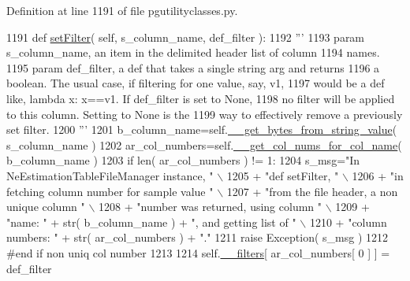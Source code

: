 Definition at line 1191 of file pgutilityclasses.\+py.


\begin{DoxyCode}
1191     \textcolor{keyword}{def }\hyperlink{classnegui_1_1pgutilityclasses_1_1NeEstimationTableFileManager_ad99b7e0a807b3bc0b52ffe7098ae261d}{setFilter}( self, s\_column\_name, def\_filter ):
1192         \textcolor{stringliteral}{'''}
1193 \textcolor{stringliteral}{        param s\_column\_name, an item in the delimited header list of column}
1194 \textcolor{stringliteral}{            names.}
1195 \textcolor{stringliteral}{        param def\_filter, a def that takes a single string arg and returns}
1196 \textcolor{stringliteral}{            a boolean.  The usual case, if filtering for one value, say, v1,}
1197 \textcolor{stringliteral}{            would be a def like, lambda x: x==v1. If def\_filter is set to None, }
1198 \textcolor{stringliteral}{            no filter will be applied to this column. Setting to None is the }
1199 \textcolor{stringliteral}{            way to effectively remove a previously set filter.}
1200 \textcolor{stringliteral}{        '''}
1201         b\_column\_name=self.\hyperlink{classnegui_1_1pgutilityclasses_1_1NeEstimationTableFileManager_afea7de4195ac346d8e2512b7367bdb7e}{\_\_get\_bytes\_from\_string\_value}( s\_column\_name )
1202         ar\_col\_numbers=self.\hyperlink{classnegui_1_1pgutilityclasses_1_1NeEstimationTableFileManager_a0439e250f2884e75dbc14cc7e0778a4c}{\_\_get\_col\_nums\_for\_col\_name}( b\_column\_name )
1203         \textcolor{keywordflow}{if} len( ar\_col\_numbers ) != 1:
1204             s\_msg=\textcolor{stringliteral}{"In NeEstimationTableFileManager instance, "} \(\backslash\)
1205                             + \textcolor{stringliteral}{"def setFilter, "} \(\backslash\)
1206                             + \textcolor{stringliteral}{"in fetching column number for sample value "} \(\backslash\)
1207                             + \textcolor{stringliteral}{"from the file header, a non unique column "} \(\backslash\)
1208                             + \textcolor{stringliteral}{"number was returned, using column "} \(\backslash\)
1209                             + \textcolor{stringliteral}{"name: "} + str( b\_column\_name ) + \textcolor{stringliteral}{", and getting list of "} \(\backslash\)
1210                             + \textcolor{stringliteral}{"column numbers: "} + str( ar\_col\_numbers ) + \textcolor{stringliteral}{"."}
1211             \textcolor{keywordflow}{raise} Exception( s\_msg )
1212         \textcolor{comment}{#end if non uniq col number}
1213 
1214         self.\hyperlink{classnegui_1_1pgutilityclasses_1_1NeEstimationTableFileManager_aefd14baba381ad71eb64d9b9597d5f01}{\_\_filters}[ ar\_col\_numbers[ 0 ] ] = def\_filter
\end{DoxyCode}
